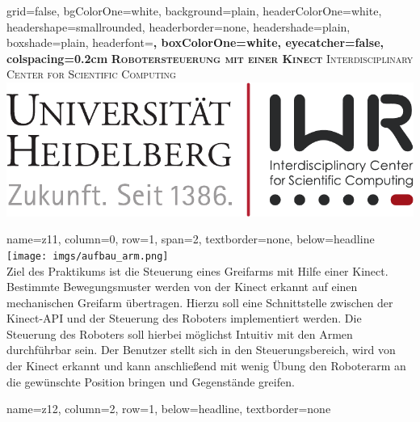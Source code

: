 \documentclass[portrait,a0paper]{baposter}
\begin{document}
\begin{poster}
  {
  grid=false,
  bgColorOne=white,
  background=plain,
  headerColorOne=white,
  headershape=smallrounded,
  headerborder=none,
  headershade=plain,
  boxshade=plain,
  headerfont=\Large\bf\textsf,
  boxColorOne=white,
  eyecatcher=false,
  colspacing=0.2cm
  }
  { } 
 {\bf\textsc{Robotersteuerung mit einer Kinect}\vspace{0.5em}}
  {
  \textsc{Interdisciplinary Center for Scientific Computing}  \vspace*{0.5em} \\

  }
  {%
    \includegraphics[scale=0.5]{imgs/IWR_Logo.pdf}
  }
 
 
    {
    name=z11,
    column=0,
    row=1,
    span=2,
    textborder=none,
    below=headline
    }
    {
    \texttt{[image: imgs/aufbau\_arm.png]}\\
Ziel des Praktikums ist die Steuerung eines Greifarms mit Hilfe einer Kinect.
Bestimmte Bewegungsmuster werden von der Kinect erkannt auf einen mechanischen Greifarm übertragen.
Hierzu soll eine Schnittstelle zwischen der Kinect-API und der Steuerung des Roboters implementiert werden.
Die Steuerung des Roboters soll hierbei möglichst Intuitiv mit den Armen durchführbar sein.
Der Benutzer stellt sich in den Steuerungsbereich, wird von der Kinect erkannt und kann anschließend mit wenig Übung den Roboterarm an die gewünschte Position bringen und Gegenstände greifen.
 }

    {
    name=z12,
    column=2,
    row=1,
    below=headline,
    textborder=none
    }
    {

}
\end{poster}
\end{document}
